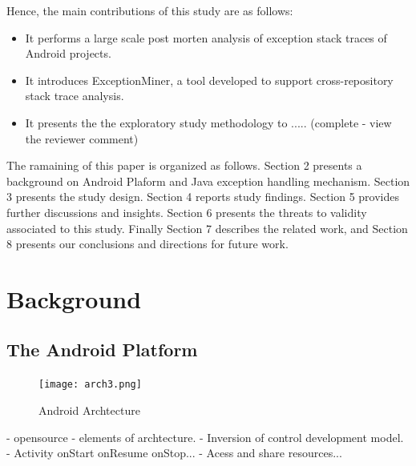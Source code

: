 \documentclass[conference]{IEEEtran}
\begin{document}
Hence, the main contributions of this study are as follows:
\begin{itemize}

  \item  It performs a large scale post morten analysis of exception stack traces of Android projects.

  \item  It introduces ExceptionMiner, a tool developed to support cross-repository stack trace
    analysis.

  \item  It presents the the exploratory study methodology to ..... (complete - view the reviewer comment)

\end{itemize}



The ramaining of this paper is organized as follows. Section 2 presents a
background on Android Plaform and Java exception handling mechanism. 
Section 3 presents the study design. Section 4 reports study findings. 
Section 5 provides further discussions and insights.
Section 6 presents the threats to validity associated to this study. Finally Section
7 describes the related work, and Section 8 presents our conclusions and
directions for future work.

\section{Background}

\subsection{The Android Platform} \label{sec:extypes}

\begin{figure} \centering \texttt{[image: arch3.png]}
  \caption{Android Archtecture} \label{fig:exchier} \end{figure}

- opensource
- elements of archtecture.
- Inversion of control development model.
- Activity onStart onResume onStop...
- Acess and share resources...
\end{document}
